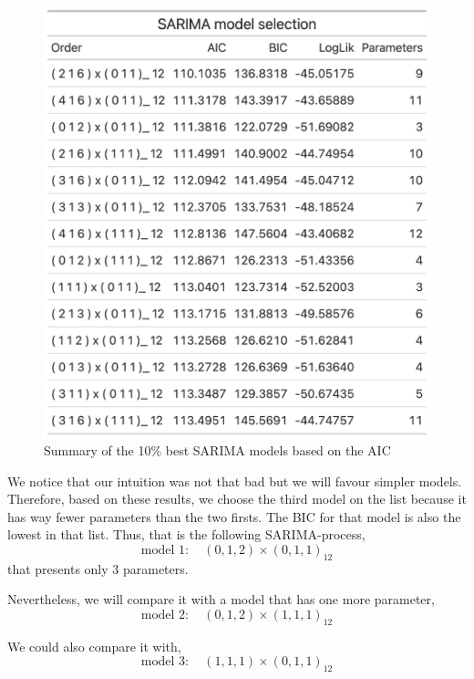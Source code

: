 \begin{figure}[H]
	\centering
	\includegraphics{figures/box_jenkins/sarima_model_selection.png}
	\caption{Summary of the 10\% best SARIMA models based on the AIC}
	\label{fig:sarima-model-selection}
\end{figure}

We notice that our intuition was not that bad but we will favour simpler models. Therefore, based on these results, we choose the third model on the list because it has way fewer parameters than the two firsts. The BIC for that model is also the lowest in that list. Thus, that is the following SARIMA-process,
\begin{equation}
	\text{model 1}: \quad (0, 1, 2) \times (0, 1, 1)_{12}
\end{equation}
that presents only $3$ parameters.

Nevertheless, we will compare it with a model that has one more parameter,
\begin{equation}
	\text{model 2}: \quad (0, 1, 2) \times (1, 1, 1)_{12}
\end{equation}

We could also compare it with, 
\begin{equation}
	\text{model 3}: \quad (1, 1, 1) \times (0, 1, 1)_{12}
\end{equation}

